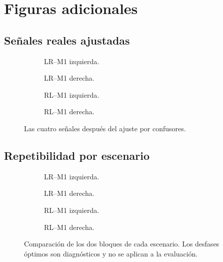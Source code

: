 \chapter{Figuras adicionales}

\section{Señales reales ajustadas}
\begin{figure}[H]
\centering
\begin{subfigure}[t]{0.49\textwidth}\caption{LR--M1 izquierda.}\end{subfigure}\hfill
\begin{subfigure}[t]{0.49\textwidth}\caption{LR--M1 derecha.}\end{subfigure}
\begin{subfigure}[t]{0.49\textwidth}\caption{RL--M1 izquierda.}\end{subfigure}\hfill
\begin{subfigure}[t]{0.49\textwidth}\caption{RL--M1 derecha.}\end{subfigure}
\caption{Las cuatro señales después del ajuste por confusores.}
\end{figure}

\section{Repetibilidad por escenario}
\begin{figure}[H]
\centering
\begin{subfigure}[t]{0.49\textwidth}\caption{LR--M1 izquierda.}\end{subfigure}\hfill
\begin{subfigure}[t]{0.49\textwidth}\caption{LR--M1 derecha.}\end{subfigure}
\begin{subfigure}[t]{0.49\textwidth}\caption{RL--M1 izquierda.}\end{subfigure}\hfill
\begin{subfigure}[t]{0.49\textwidth}\caption{RL--M1 derecha.}\end{subfigure}
\caption{Comparación de los dos bloques de cada escenario. Los desfases óptimos son diagnósticos y no se aplican a la evaluación.}
\end{figure}

